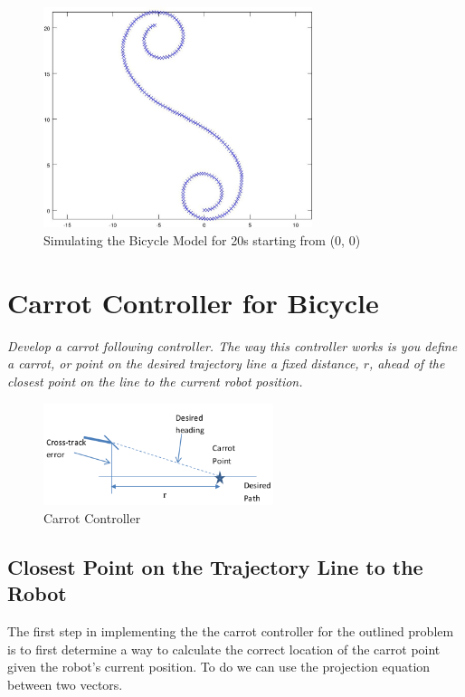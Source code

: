 \documentclass{article}
\begin{document}
\begin{figure}[H]
	\centering
	\includegraphics[width=0.7\textwidth]{images/bicycle_motion_20s.jpg}
	\caption{Simulating the Bicycle Model for 20s starting from (0, 0)}
	\label{fig:bicycle_20s}
\end{figure}


\newpage
\section{Carrot Controller for Bicycle}

\textit{Develop a carrot following controller.  The way this controller works is you define a carrot, or point on the desired trajectory line a fixed distance, $r$, ahead of the closest point on the line to the current robot position.}

\begin{figure}[H]
	\centering
	\includegraphics[width=0.6\textwidth]{images/carrot_controller.png}
	\caption{Carrot Controller}
	\label{fig:carrot_controller}
\end{figure}


\subsection{Closest Point on the Trajectory Line to the Robot}
The first step in implementing the the carrot controller for the outlined problem is to first determine a way to calculate the correct location of the carrot point given the robot's current position. To do we can use the projection equation between two vectors. 
\end{document}
